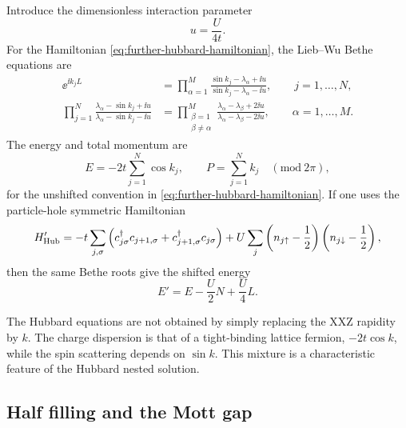 Introduce the dimensionless interaction parameter
\begin{equation}
\label{eq:further-hubbard-u-parameter}
    u=\frac{U}{4t}.
\end{equation}
For the Hamiltonian \cref{eq:further-hubbard-hamiltonian}, the Lieb--Wu Bethe
equations are
\begin{align}
\label{eq:further-lieb-wu-charge}
    \ee^{\ii k_j L}
    &=
    \prod_{\alpha=1}^{M}
    \frac{\sin k_j-\lambda_\alpha+\ii u}
         {\sin k_j-\lambda_\alpha-\ii u},
    \qquad
    j=1,\ldots,N,\\
\label{eq:further-lieb-wu-spin}
    \prod_{j=1}^{N}
    \frac{\lambda_\alpha-\sin k_j+\ii u}
         {\lambda_\alpha-\sin k_j-\ii u}
    &=
    \prod_{\substack{\beta=1\\ \beta\neq\alpha}}^{M}
    \frac{\lambda_\alpha-\lambda_\beta+2\ii u}
         {\lambda_\alpha-\lambda_\beta-2\ii u},
    \qquad
    \alpha=1,\ldots,M .
\end{align}
The energy and total momentum are
\begin{equation}
\label{eq:further-hubbard-energy-momentum}
    E=-2t\sum_{j=1}^{N}\cos k_j,
    \qquad
    P=\sum_{j=1}^{N}k_j
    \quad (\mathrm{mod}\ 2\pi),
\end{equation}
for the unshifted convention in \cref{eq:further-hubbard-hamiltonian}.  If one
uses the particle-hole symmetric Hamiltonian
\begin{equation}
\label{eq:further-shifted-hubbard}
    H'_{\rm Hub}
    =
    -t\sum_{j,\sigma}
    \left(
        c_{j\sigma}^\dagger c_{j+1,\sigma}
        +c_{j+1,\sigma}^\dagger c_{j\sigma}
    \right)
    +U\sum_j
    \left(n_{j\uparrow}-\frac12\right)
    \left(n_{j\downarrow}-\frac12\right),
\end{equation}
then the same Bethe roots give the shifted energy
\begin{equation}
\label{eq:further-shifted-hubbard-energy}
    E'=E-\frac{U}{2}N+\frac{U}{4}L .
\end{equation}

\begin{remark}
The Hubbard equations are not obtained by simply replacing the XXZ rapidity by
$k$.  The charge dispersion is that of a tight-binding lattice fermion,
$-2t\cos k$, while the spin scattering depends on $\sin k$.  This mixture is a
characteristic feature of the Hubbard nested solution.
\end{remark}

\subsection{Half filling and the Mott gap}
\label{subsec:further-hubbard-half-filling}

